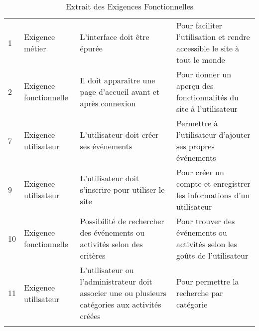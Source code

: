{
\small
\begin{longtable}{|p{0.5cm}|p{2cm}|p{6cm}|p{6cm}|}%
\hline 
\cellcolor{gray}{\textbf{ID}} & \cellcolor{gray}{\textbf{Catégorie (Wiegers)}} & \cellcolor{gray}{\textbf{Description}} & \cellcolor{gray}{\textbf{Justification}}\\ \hline \endhead  %

\endfoot
 
1 & Exigence métier & L'interface doit être épurée & Pour faciliter l'utilisation et rendre accessible le site à tout le monde\\\hline%

2 & Exigence fonctionnelle & Il doit apparaître une page d'accueil avant et après connexion & Pour donner un aperçu des fonctionnalités du site à l'utilisateur\\\hline %

7 & Exigence utilisateur & L'utilisateur doit créer ses événements & Permettre à l'utilisateur d'ajouter ses propres événements\\\hline %

9 & Exigence utilisateur & L'utilisateur doit s'inscrire pour utiliser le site & Pour créer un compte et enregistrer les informations d'un utilisateur\\\hline %

10 & Exigence fonctionnelle & Possibilité de rechercher des événements ou activités selon des critères & Pour trouver des événements ou activités selon les goûts de l'utilisateur\\\hline %

11 & Exigence utilisateur & L'utilisateur ou l'administrateur doit associer une ou plusieurs catégories aux activités créées & Pour permettre la recherche par catégorie\\\hline %

\caption{Extrait des Exigences Fonctionnelles}
\end{longtable} 
}

